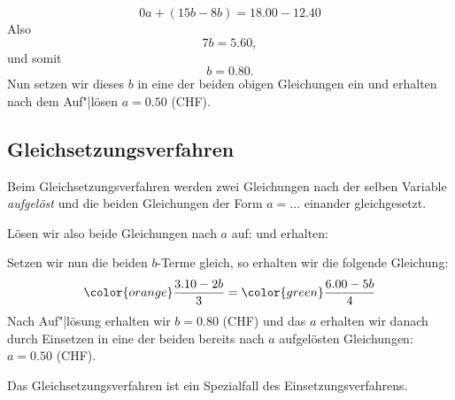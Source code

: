 $$0a  + (15b - 8b)  = 18.00 - 12.40$$
Also
$$7b = 5.60,$$ und somit
$$b = 0.80.$$
Nun setzen wir dieses $b$ in eine der beiden obigen Gleichungen ein und erhalten nach dem Auf"|lösen $a=0.50$ (CHF).
\newpage


\newpage


\subsection{Gleichsetzungsverfahren}\label{lin_gl_gleichsetzungsverfahren}
Beim Gleichsetzungsverfahren werden zwei Gleichungen nach der selben Variable \textit{aufgelöst} und die beiden Gleichungen der Form $a = ...$ einander gleichgesetzt.

Lösen wir also beide Gleichungen nach $a$ auf:
und erhalten:



Setzen wir nun die beiden $b$-Terme gleich, so erhalten wir die folgende Gleichung:
$${\color{orange}\frac{3.10 - 2b}{3}} = {\color{green}\frac{6.00 - 5b}{4}}$$
Nach Auf"|lösung erhalten wir $b=0.80$ (CHF) und das $a$ erhalten wir danach durch Einsetzen in eine der beiden bereits nach $a$ aufgelösten Gleichungen: $a=0.50$ (CHF).

Das Gleichsetzungsverfahren ist ein Spezialfall des
Einsetzungsverfahrens.
\newpage


\newpage

